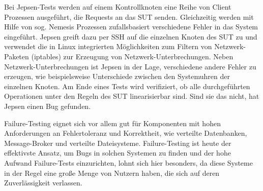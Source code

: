 \documentclass[12pt,a4paper]{report}
\begin{document}
Bei Jepsen-Tests werden auf einem Kontrollknoten eine Reihe von Client Prozessen ausgeführt, die Requests an das SUT senden.
Gleichzeitig werden mit Hilfe von sog. Nemesis Prozessen zufallsbasiert verschiedene Fehler in das System eingeführt. Jepsen
greift dazu per SSH auf die einzelnen Knoten des SUT zu und verwendet die in Linux integrierten Möglichkeiten zum Filtern von
Netzwerk-Paketen (iptables) zur Erzeugung von Netzwerk-Unterbrechungen. Neben Netzwerk-Unterbrechungen ist Jepsen in der Lage,
verschiedene andere Fehler zu erzeugen, wie beispielsweise Unterschiede zwischen den Systemuhren der einzelnen Knoten. Am Ende
eines Tests wird verifiziert, ob alle durchgeführten Operationen unter den Regeln des SUT linearisierbar sind. Sind sie das nicht,
hat Jepsen einen Bug gefunden. \cite{jepsen_github}

Failure-Testing eignet sich vor allem gut für Komponenten mit hohen Anforderungen an Fehlertoleranz und Korrektheit, wie verteilte
Datenbanken, Message-Broker und verteilte Dateisysteme. Failure-Testing ist heute der effektivste Ansatz, um Bugs in solchen
Systemen zu finden \cite{abstracting_the_geniuses} und der hohe Aufwand Failure-Tests einzurichten, lohnt sich hier besonders, da
diese Systeme in der Regel eine große Menge von Nutzern haben, die sich auf deren Zuverlässigkeit verlassen.
\end{document}
